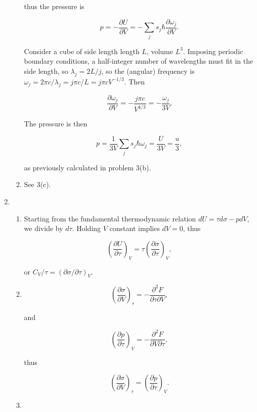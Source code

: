 \documentclass{article}
\begin{document}
\begin{enumerate}
\begin{enumerate}
		thus the pressure is

		$$p = -\frac{\partial U}{\partial V} = - \sum \limits_j s_j \hbar \frac{\partial \omega_j} {\partial V}.$$

		Consider a cube of side length length $L$, volume $L^3$. Imposing periodic boundary conditions, a half-integer number of wavelengths must fit in the side length, so $\lambda_j = 2L / j$, so the (angular) frequency is $\omega_j = 2\pi c / \lambda_j = j\pi c/ L = j \pi c V^{-1/3}.$ Then

		$$\frac{\partial \omega_j}{\partial V} = -\frac{j \pi c}{V^{4/3}} = - \frac{\omega_j}{3V}.$$

		The pressure is then 

		$$p = \frac{1}{3V} \sum \limits_j s_j \hbar \omega_j = \frac{U}{3V} = \frac{u}{3},$$

		as previously calculated in problem 3(b).

		\item

		See 3(c).

	\end{enumerate}

	\item

	\begin{enumerate}

		\item

		Starting from the fundamental thermodynamic relation $dU = \tau d\sigma - p dV$, we divide by $d \tau$. Holding $V$ constant implies $dV = 0$, thus

		$$ \left( \frac{\partial U}{ \partial \tau} \right)_V = \tau \left( \frac{\partial \sigma}{\partial \tau} \right)_V,$$

		or $C_V / \tau = (\partial \sigma / \partial \tau)_V.$

		\item

		$$\left( \frac{\partial \sigma}{\partial V} \right)_\tau = - \frac{\partial^2 F}{\partial \tau \partial V},$$

		and 

		$$\left( \frac{\partial p}{\partial \tau} \right)_V = - \frac{\partial^2 F}{\partial V \partial \tau},$$

		thus

		$$\left( \frac{\partial \sigma}{\partial V} \right)_\tau  = \left( \frac{\partial p}{\partial \tau} \right)_V.$$

		\item


\end{enumerate}
\end{enumerate}
\end{document}
